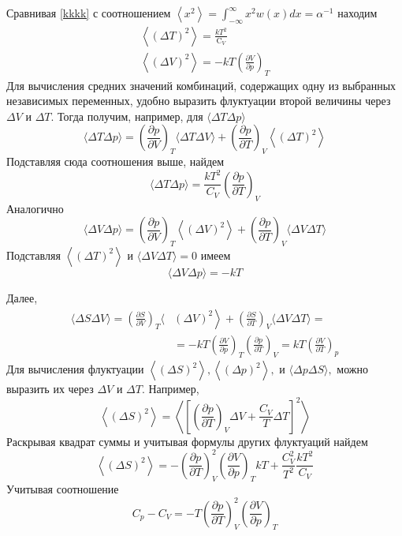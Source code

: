\documentclass[a4paper,12pt]{article} %
\begin{document}
\begin{ttask}
Сравнивая \ref{kkkk} с соотношением $\left\langle x^{2}\right\rangle=\int_{-\infty}^{\infty} x^{2} w(x) d x=\alpha^{-1}$ 
находим
$$
\begin{array}{c}
\left\langle(\Delta T)^{2}\right\rangle=\frac{k T^{2}}{\mathrm{C}_{V}} \\
\left\langle(\Delta V)^{2}\right\rangle=-k T\left(\frac{\partial V}{\partial p}\right)_{T}
\end{array}
$$
Для вычисления средних значений комбинаций, содержащих одну из выбранных независимых переменных, удобно выразить флуктуации второй величины через $\Delta V$ и $\Delta T .$ Тогда получим, например, для $\langle\Delta T \Delta p\rangle$
$$
\langle\Delta T \Delta p\rangle=\left(\frac{\partial p}{\partial V}\right)_{T}\langle\Delta T \Delta V\rangle+\left(\frac{\partial p}{\partial T}\right)_{V}\left\langle(\Delta T)^{2}\right\rangle
$$
Подставляя сюда соотношения выше, найдем
$$
\langle\Delta T \Delta p\rangle=\frac{k T^{2}}{C_{V}}\left(\frac{\partial p}{\partial T}\right)_{V}
$$
Аналогично
$$
\langle\Delta V \Delta p\rangle=\left(\frac{\partial p}{\partial V}\right)_{T}\left\langle(\Delta V)^{2}\right\rangle+\left(\frac{\partial p}{\partial T}\right)_{V}\langle\Delta V \Delta T\rangle
$$
Подставляя $ \left\langle(\Delta T)^{2}\right\rangle $ и $\langle\Delta V \Delta T\rangle=0$ имеем
$$
\langle\Delta V \Delta p\rangle=-k T
$$

Далее,
$$
\begin{aligned}
\langle\Delta S \Delta V\rangle=\left(\frac{\partial S}{\partial V}\right)_{T}\langle&\left.(\Delta V)^{2}\right\rangle+\left(\frac{\partial S}{\partial T}\right)_{V}\langle\Delta V \Delta T\rangle=\\
&=-k T\left(\frac{\partial V}{\partial p}\right)_{T}\left(\frac{\partial p}{\partial T}\right)_{V}=k T\left(\frac{\partial V}{\partial T}\right)_{p}
\end{aligned}
$$
Для вычисления флуктуации $\left\langle(\Delta S)^{2}\right\rangle,\left\langle(\Delta p)^{2}\right\rangle,$ и $\langle\Delta p \Delta S\rangle,$ можно
выразить их через $\Delta V$ и $\Delta T .$ Например,
$$
\left\langle(\Delta S)^{2}\right\rangle=\left\langle\left[\left(\frac{\partial p}{\partial T}\right)_{V} \Delta V+\frac{C_{V}}{T} \Delta T\right]^{2}\right\rangle
$$
Раскрывая квадрат суммы и учитывая формулы других флуктуаций найдем
$$
\left\langle(\Delta S)^{2}\right\rangle=-\left(\frac{\partial p}{\partial T}\right)_{V}^{2}\left(\frac{\partial V}{\partial p}\right)_{T} k T+\frac{C_{V}^{2}}{T^{2}} \frac{k T^{2}}{C_{V}}
$$
Учитывая соотношение
\begin{equation}\label{lll}
C_{p}-C_{V}=-T\left(\frac{\partial p}{\partial T}\right)_{V}^{2}\left(\frac{\partial V}{\partial p}\right)_{T}
\end{equation}


\end{ttask}
\end{document}
